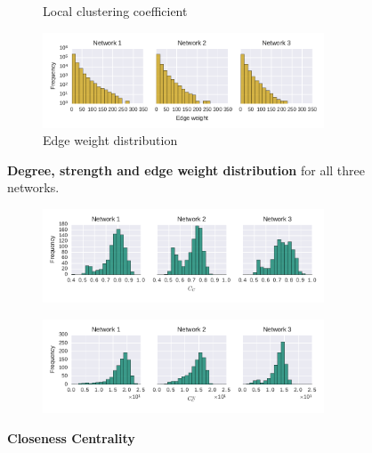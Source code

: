 \begin{figure}[!t]
\begin{subfigure}[b]{1.0\textwidth}
	\caption[Local clustering coefficient]{Local clustering coefficient}
	\label{fig:statlccDist}
	\end{subfigure}
	\begin{subfigure}[b]{1.0\textwidth}
	\centering
	\includegraphics[width=0.92\textwidth]{Figures/stat-edgeWeightDist}
	\caption[Edge weight distribution]{Edge weight distribution}
	\label{fig:statEdgeWeightDist}
	\end{subfigure}
	\caption[Degree, strength and edge weight distribution]{\textbf{Degree, strength and edge weight distribution} for all three networks.}
	\label{fig:distributions}
\end{figure}


\begin{figure}[htb]
	\centering
	\begin{subfigure}[b]{1.0\textwidth}
	\centering
	\includegraphics[width=0.92\textwidth]{Figures/stat-closenessDist}
	\label{fig:closenessDistUW}
	\end{subfigure} 
	\begin{subfigure}[b]{1.0\textwidth}
	\centering
	\includegraphics[width=0.92\textwidth]{Figures/stat-closenessWDist}
	\label{fig:closenessDistW}
	\end{subfigure}
	\caption[Closeness Centrality]{\textbf{Closeness Centrality}}
	\label{fig:closenessDist}
\end{figure}

